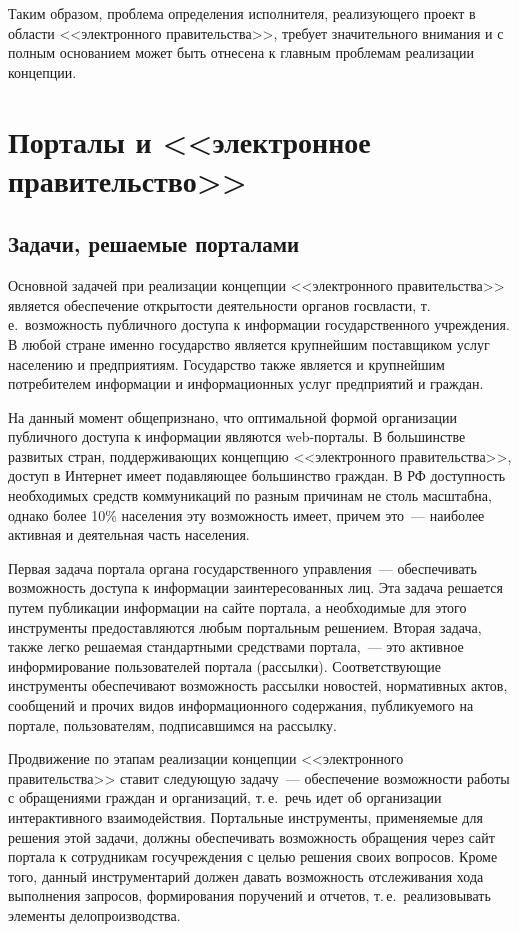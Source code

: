 \begin{multicols}{2}
Таким образом, проблема определения исполнителя, реализующего проект в области
<<электронного правительства>>, требует значительного внимания и с полным
основанием может быть отнесена к главным проблемам реализации концепции.

\section{Порталы и <<электронное правительство>>} %

\subsection{Задачи, решаемые порталами} %

Основной задачей при реализации концепции <<электронного правительства>> является
обеспечение открытости деятельности органов госвласти, т.\,е.\ возможность публичного
доступа к информации государственного учреждения. В любой стране именно
государство является крупнейшим поставщиком услуг населению и предприятиям.
Государство также является и крупнейшим потребителем информации и информационных
услуг предприятий и граждан.

На данный момент общепризнано, что оптимальной формой организации публичного
доступа к информации являются web-порталы. В большинстве развитых стран,
поддерживающих концепцию <<электронного правительства>>, доступ в Интернет имеет
подавляющее большинство граждан. В РФ доступность необходимых средств
коммуникаций по разным причинам не столь масштабна, однако более 10\% населения эту
возможность имеет, причем это~--- наиболее активная и деятельная часть населения.

Первая задача портала органа государственного управления~--- обеспечивать
возможность доступа к информации заинтересованных лиц. Эта задача решается путем
публикации информации на
 сайте портала, а необходимые для этого ин\-стру\-менты
предоставляются любым портальным решением. Вторая задача, также легко решаемая
стандартными средствами портала,~--- это активное
 инфор\-ми\-ро\-ва\-ние 
пользователей портала (рассылки). Соответствующие инструменты обеспечивают возможность
рассылки новостей, нормативных актов, сообщений и прочих видов информационного
содержания, публикуемого на портале, пользователям, подписавшимся на рассылку.

Продвижение по этапам реализации концепции <<электронного правительства>> ставит
следующую задачу~--- обеспечение возможности работы с обращениями граждан и
организаций, т.\,е.\ речь идет об организации интерактивного взаимодействия.
Портальные инструменты, применяемые для решения этой задачи, должны обеспечивать
возможность обращения через сайт портала к сотрудникам госучреждения с целью
решения своих вопросов. Кроме того, данный инструментарий должен давать
возможность отслеживания хода выполнения запросов, формирования поручений и
отчетов, т.\,е.\ реализовывать элементы делопроизводства.


\end{multicols}
